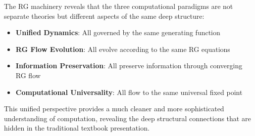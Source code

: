 The RG machinery reveals that the three computational paradigms are not separate theories but different aspects of the same deep structure:

\begin{itemize}
\item \textbf{Unified Dynamics}: All governed by the same generating function
\item \textbf{RG Flow Evolution}: All evolve according to the same RG equations
\item \textbf{Information Preservation}: All preserve information through converging RG flow
\item \textbf{Computational Universality}: All flow to the same universal fixed point
\end{itemize}

This unified perspective provides a much cleaner and more sophisticated understanding of computation, revealing the deep structural connections that are hidden in the traditional textbook presentation.

